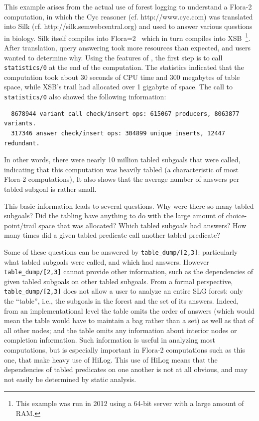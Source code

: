 \begin{example} \rm \label{ex:scc-anal}
%
This example arises from the actual use of forest logging to
understand a Flora-2 computation, in which the Cyc reasoner
(cf. http://www.cyc.com) was translated into Silk
(cf. http://silk.semwebcentral.org) and used to answer various
questions in biology.  Silk itself compiles into Flora=2~\cite{YaKZ05}
which in turn compiles into XSB~\footnote{This example was run in 2012
  using a 64-bit server with a large amount of RAM.}.  After
translation, query answering took more resources than expected, and
users wanted to determine why.  Using the features of \version{}, the
first step is to call {\tt statistics/0} at the end of the
computation.  The statistics indicated that the computation took about
30 seconds of CPU time and 300 megabytes of table space, while XSB's
trail had allocated over 1 gigabyte of space.  The call to {\tt
  statistics/0} also showed the following information:
%
\begin{verbatim}
  8678944 variant call check/insert ops: 615067 producers, 8063877 variants.
  317346 answer check/insert ops: 304899 unique inserts, 12447 redundant.
\end{verbatim}
In other words, there were nearly 10 million tabled subgoals that were
called, indicating that this computation was heavily tabled (a
characteristic of most Flora-2 computations), It also shows that the
average number of answers per tabled subgoal is rather small.

This basic information leads to several questions.  Why were there so
many tabled subgoals?  Did the tabling have anything to do with the
large amount of choice-point/trail space that was allocated?  Which
tabled subgoals had answers?  How many times did a given tabled
predicate call another tabled predicate?

 Some of
these questions can be answered by {\tt table\_dump/[2,3]}:
particularly what tabled subgoals were called, and which had answers.
However {\tt table\_dump/[2,3]} cannot provide other information, such
as the dependencies of given tabled subgoals on other tabled subgoals.
From a formal perspective, {\tt table\_dump/[2,3]} does not allow a
user to analyze an entire SLG forest: only the ``table'', i.e., the
subgoals in the forest and the set of its answers.  Indeed, from an
implementational level the table omits the order of answers (which
would mean the table would have to maintain a bag rather than a set)
as well as that of all other nodes; and the table omits any
information about interior nodes or completion information.  Such
information is useful in analyzing most computations, but is
especially important in Flora-2 computations such as this one, that
make heavy use of HiLog.  This use of HiLog means that the
dependencies of tabled predicates on one another is not at all
obvious, and may not easily be determined by static analysis.


\end{example}
